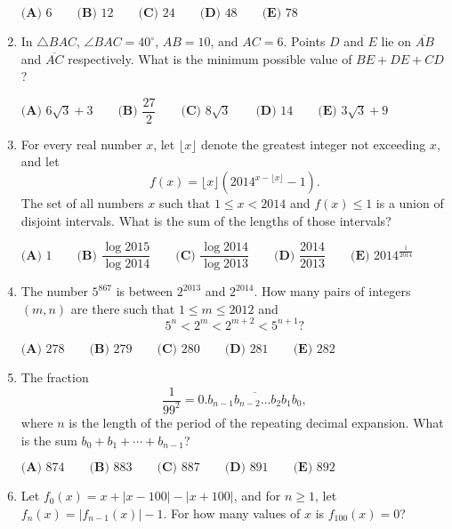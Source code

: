 \documentclass{article}
\begin{document}
\begin{enumerate}[label=\arabic*., itemsep=0.5em]
$\textbf{(A) }6\qquad
\textbf{(B) }12\qquad
\textbf{(C) }24\qquad
\textbf{(D) }48\qquad
\textbf{(E) }78\qquad$\par \vspace{0.5em}\item In $\triangle BAC$, $\angle BAC=40^\circ$, $AB=10$, and $AC=6$.  Points $D$ and $E$ lie on $\overline{AB}$ and $\overline{AC}$ respectively.  What is the minimum possible value of $BE+DE+CD$?

$\textbf{(A) }6\sqrt 3+3\qquad
\textbf{(B) }\dfrac{27}2\qquad
\textbf{(C) }8\sqrt 3\qquad
\textbf{(D) }14\qquad
\textbf{(E) }3\sqrt 3+9\qquad$\par \vspace{0.5em}\item For every real number $x$, let $\lfloor x\rfloor$ denote the greatest integer not exceeding $x$, and let 
\begin{equation*}
f(x)=\lfloor x\rfloor(2014^{x-\lfloor x\rfloor}-1).
\end{equation*}
  The set of all numbers $x$ such that $1\leq x<2014$ and $f(x)\leq 1$ is a union of disjoint intervals.  What is the sum of the lengths of those intervals?

$\textbf{(A) }1\qquad
\textbf{(B) }\dfrac{\log 2015}{\log 2014}\qquad
\textbf{(C) }\dfrac{\log 2014}{\log 2013}\qquad
\textbf{(D) }\dfrac{2014}{2013}\qquad
\textbf{(E) }2014^{\frac1{2014}}\qquad$\par \vspace{0.5em}\item The number $5^{867}$ is between $2^{2013}$ and $2^{2014}$.  How many pairs of integers $(m,n)$ are there such that $1\leq m\leq 2012$ and 
\begin{equation*}
5^n<2^m<2^{m+2}<5^{n+1}?
\end{equation*}

$\textbf{(A) }278\qquad
\textbf{(B) }279\qquad
\textbf{(C) }280\qquad
\textbf{(D) }281\qquad
\textbf{(E) }282\qquad$\par \vspace{0.5em}\item The fraction 
\begin{equation*}
\dfrac1{99^2}=0.\overline{b_{n-1}b_{n-2}\ldots b_2b_1b_0},
\end{equation*}
 where $n$ is the length of the period of the repeating decimal expansion.  What is the sum $b_0+b_1+\cdots+b_{n-1}$?

$\textbf{(A) }874\qquad
\textbf{(B) }883\qquad
\textbf{(C) }887\qquad
\textbf{(D) }891\qquad
\textbf{(E) }892\qquad$\par \vspace{0.5em}\item Let $f_0(x)=x+|x-100|-|x+100|$, and for $n\geq 1$, let $f_n(x)=|f_{n-1}(x)|-1$.  For how many values of $x$ is $f_{100}(x)=0$?


\end{enumerate}
\end{document}
